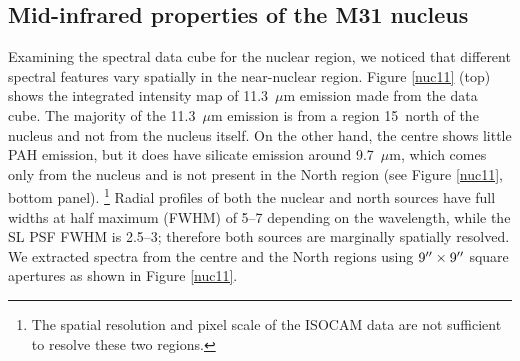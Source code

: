 \subsection{Mid-infrared properties of the M31 nucleus}
\label{sect:nucleus}



Examining the spectral data cube for the nuclear region, we noticed that different spectral features
vary spatially in the near-nuclear region.
Figure \ref{nuc11} (top) shows the integrated intensity map of 11.3~$\mu$m emission made from the data cube. 
The majority of the 11.3~$\mu$m  emission is from a region 15\arcsec\ north of the nucleus and not from the nucleus itself. 
On the other hand, the centre shows little PAH emission,  but it does have silicate emission around 9.7~$\mu$m, 
which comes only from the nucleus and is not present in the North region  (see Figure \ref{nuc11}, bottom panel).%
\footnote{The spatial resolution and pixel scale of the ISOCAM data are not sufficient to resolve these two regions.}
Radial profiles of both the nuclear and north sources have full widths at half maximum (FWHM) of 5--7\arcsec
depending on the wavelength, while the SL PSF FWHM is 2.5--3\arcsec; therefore both sources are
marginally spatially resolved.  %
We extracted spectra from the centre and the North regions using  $9\hbox{$^{\prime\prime}$} \times 9\hbox{$^{\prime\prime}$}$ 
square apertures as shown in Figure \ref{nuc11}. 

